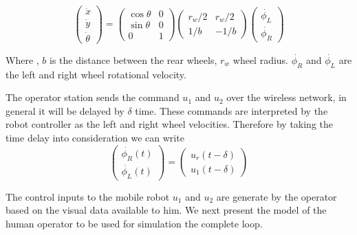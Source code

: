 \begin{equation}
\begin{pmatrix}
\dot{x}\\ 
\dot{y}\\ 
\dot{\theta}
\end{pmatrix}
=
\begin{pmatrix}
\cos \theta & 0 \\
\sin \theta & 0 \\
0& 1
\end{pmatrix}
\begin{pmatrix}
r_w/2 & r_w/2\\
1/b & -1/b
\end{pmatrix}
\begin{pmatrix}
\dot{\phi_L}\\
\dot{\phi_R}
\end{pmatrix}
\end{equation}


Where ,  $b$ is the distance between the rear wheels, $r_w$ wheel radius. $\dot{\phi_R}$ and $\dot{\phi_L} $ are the left and right wheel rotational velocity. 

The operator station sends the command $u_1$ and $u_2$ over the wireless network, in general it will be delayed by $\delta$ time. These commands are interpreted by the robot controller as the left and right wheel velocities.  Therefore by taking the time delay into consideration we can write
\begin{equation}
\begin{pmatrix}
\dot{\phi_R}(t) \\
 \dot{\phi_L}(t)
\end{pmatrix}
=
\begin{pmatrix}
u_r(t-\delta)\\
u_1(t-\delta)
\end{pmatrix}
\end{equation}

The control inputs to the mobile robot  $u_1$ and $u_2$ are generate by the operator based on the visual data available to him. We next present the model of the human operator to be used for simulation the complete loop.



